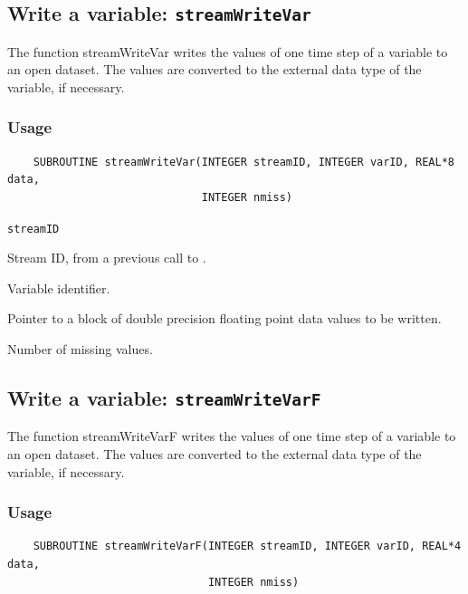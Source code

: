 

\subsection{Write a variable: {\tt streamWriteVar}}
\label{streamWriteVar}

The function streamWriteVar writes the values of one time step of a variable to an open dataset.
The values are converted to the external data type of the variable, if necessary.
\subsubsection*{Usage}

\begin{verbatim}
    SUBROUTINE streamWriteVar(INTEGER streamID, INTEGER varID, REAL*8 data, 
                              INTEGER nmiss)
\end{verbatim}

\hspace*{4mm}\begin{minipage}[]{15cm}
\begin{deflist}{\tt streamID\ }
\item[{\tt streamID}]
Stream ID, from a previous call to {}.
\item[{\tt varID}]
Variable identifier.
\item[{\tt data}]
Pointer to a block of double precision floating point data values to be written.
\item[{\tt nmiss}]
Number of missing values.

\end{deflist}
\end{minipage}


\subsection{Write a variable: {\tt streamWriteVarF}}
\label{streamWriteVarF}

The function streamWriteVarF writes the values of one time step of a variable to an open dataset.
The values are converted to the external data type of the variable, if necessary.
\subsubsection*{Usage}

\begin{verbatim}
    SUBROUTINE streamWriteVarF(INTEGER streamID, INTEGER varID, REAL*4 data, 
                               INTEGER nmiss)
\end{verbatim}


